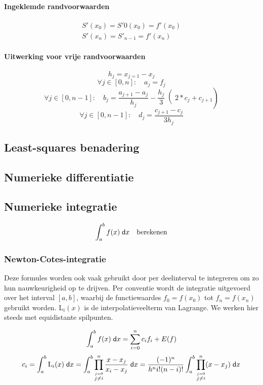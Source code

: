 \paragraph{Ingeklemde randvoorwaarden}
\[
  \begin{array}{l}
    S'(x_0) = S'0(x_0) = f'(x_0)\\
    S'(x_n) = S'_{n-1} = f'(x_n)
  \end{array}
\]

\paragraph{Uitwerking voor vrije randvoorwaarden}
\[
  h_j = x_{j=1} - x_j
\]
\[
  \forall j \in [0,n]:\quad a_j = f_j
\]
\[
  \forall j \in [0,n-1]:\quad b_j = \frac{a_{j+1}-a_j}{h_j} - \left.\left.\frac{h_j}{3}\right( 2*c_j + c_{j+1}\right)
\]
\[
  \forall j \in [0,n-1]:\quad d_j = \frac{c_{j+1} - c_j}{3h_j}
\]







\subsection{Least-squares benadering}

\subsection{Numerieke differentiatie}

\subsection{Numerieke integratie}
\[
  \int_a^b f(x) \;\textsf{d}x \quad \mbox{berekenen}
\]

\subsubsection{Newton-Cotes-integratie}
Deze formules worden ook vaak gebruikt door per deelinterval te integreren om zo hun nauwkeurigheid op te drijven. Per conventie wordt de integratie uitgevoerd over het interval $[a,b]$, waarbij de functiewaardes $f_0 = f(x_0)$ tot $f_n = f(x_n)$ gebruikt worden. $\mathrm{L}_i(x)$ is de interpolatieveelterm van Lagrange. We werken hier steeds met equidistante spilpunten.

\[
  \int_a^b f(x) \;\textsf{d}x = \sum_{i=0}^n c_i f_i + E(f)
\]
\[
  c_i = \int_a^b \mathrm{L}_i(x)\;\textsf{d}x
  = \int_a^b  \prod_{\stackrel{j=0}{j\neq i}}^n \frac{x-x_j}{x_i-x_j}\;\textsf{d}x
  = \frac{(-1)^n}{h^n i! (n-i)!} \int_a^b  \prod_{\stackrel{j=0}{j\neq i}}^n (x - x_j)\;\textsf{d}x
\]

